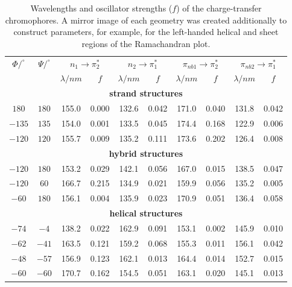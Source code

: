 \documentclass[11pt, letterpaper]{article}
\begin{document}
\begin{table}
\captionsetup{width=0.8\textwidth, labelformat=simple, labelsep=colon}
\caption[Wavelengths and oscillator strengths of the CT chromophores]
        {Wavelengths and oscillator strengths ($f$) of the charge-transfer chromophores. A mirror image of each geometry was created additionally to construct parameters, for example, for the left-handed helical and sheet regions of the Ramachandran plot.\cite{Oakley:06:12414, Oakley:06:340, Bulheller:08:1866}}
\label{Tab:CT-Chromophores}
\vspace{1em}

\centering
\linespread{1.4}\normalsize
\setlength{\tabcolsep}{1.5em}

\begin{tabular}{cccccccccc} \toprule
$\Phi/^\circ$                                         &
$\Psi/^\circ$                                         &
\multicolumn{2}{c}{$n_1 \rightarrow \pi_2^*$}         &
\multicolumn{2}{c}{$n_2 \rightarrow \pi_1^*$}         &
\multicolumn{2}{c}{$\pi_{nb1} \rightarrow \pi_2^*$}   & 
\multicolumn{2}{c}{$\pi_{nb2} \rightarrow \pi_1^*$}   \\ \cline{3-4} \cline{5-6} \cline{7-8} \cline{9-10}
 & 
 & 
 $\lambda/nm$ & $f$ &
 $\lambda/nm$ & $f$ &
 $\lambda/nm$ & $f$ &
 $\lambda/nm$ & $f$ \\ \midrule
\multicolumn{10}{c}{\textbf{strand structures}} \\
$180$   &  $180$  &  155.0  &  0.000  &  132.6  &  0.042  &  171.0  &  0.040  &  131.8  &  0.042  \\
$-135$  &  $135$  &  154.0  &  0.001  &  133.5  &  0.045  &  174.4  &  0.168  &  122.9  &  0.006  \\
$-120$  &  $120$  &  155.7  &  0.009  &  135.2  &  0.111  &  173.6  &  0.202  &  126.4  &  0.008  \\ [1ex]
\multicolumn{10}{c}{\textbf{hybrid structures}} \\
$-120$  &  $180$  &  153.2  &  0.029  &  142.1  &  0.056  &  167.0  &  0.015  &  138.5  &  0.047  \\
$-120$  &   $60$  &  166.7  &  0.215  &  134.9  &  0.021  &  159.9  &  0.056  &  135.2  &  0.005  \\
$-60$   &  $180$  &  156.1  &  0.004  &  135.9  &  0.023  &  170.9  &  0.051  &  136.4  &  0.058  \\ [1ex]
\multicolumn{10}{c}{\textbf{helical structures}} \\
$-74$   &   $-4$  &  138.2  &  0.022  &  162.9  &  0.091  &  153.1  &  0.002  &  145.9  &  0.010  \\
$-62$   &  $-41$  &  163.5  &  0.121  &  159.2  &  0.068  &  155.3  &  0.011  &  156.1  &  0.042  \\
$-48$   &  $-57$  &  156.9  &  0.123  &  162.1  &  0.013  &  164.4  &  0.014  &  152.7  &  0.015  \\
$-60$   &  $-60$  &  170.7  &  0.162  &  154.5  &  0.051  &  163.1  &  0.020  &  145.1  &  0.013  \\ \bottomrule
\end{tabular}
\end{table}
\end{document}
